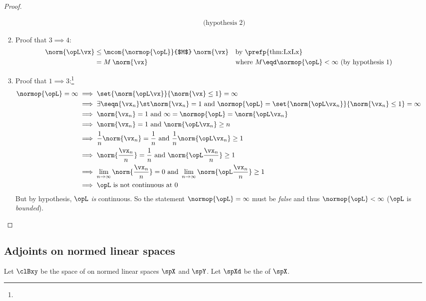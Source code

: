 \begin{proof}
\begin{enumerate}
\begin{align*}
        && \text{(hypothesis 2)}
    \end{align*}
  \item Proof that $3\implies4$:
    \begin{align*}
      \norm  {\opL \vx}
        &\le \mcom{\normop{\opL}}{$M$}\:\norm{\vx}
        &&   \text{by \prefp{thm:LxLx}}
      \\&=   M\:\norm{\vx}
        &&   \text{where $M\eqd\normop{\opL}<\infty$ (by hypothesis 1)}
    \end{align*}
  \item Proof that $1\implies3$:\footnote{}
    \begin{align*}
      \normop{\opL} = \infty
        &\implies \set{\norm{\opL\vx}}{\norm{\vx}\le1} = \infty
      \\&\implies \exists\seqn{\vx_n} \st \norm{\vx_n}=1 \text{ and } \normop{\opL} = \set{\norm{\opL\vx_n}}{\norm{\vx_n}\le1} = \infty
      \\&\implies \norm{\vx_n}=1 \text{ and } \infty=\normop{\opL} = \norm{\opL\vx_n}
      \\&\implies \norm{\vx_n}=1 \text{ and } \norm{\opL\vx_n} \ge n
      \\&\implies \frac{1}{n}\norm{\vx_n}=\frac{1}{n} \text{ and } \frac{1}{n}\norm{\opL\vx_n} \ge 1
      \\&\implies \norm{\frac{\vx_n}{n}}=\frac{1}{n} \text{ and } \norm{\opL\frac{\vx_n}{n}} \ge 1
      \\&\implies \lim_{n\to\infty}\norm{\frac{\vx_n}{n}}=0 \text{ and } \lim_{n\to\infty}\norm{\opL\frac{\vx_n}{n}} \ge 1
      \\&\implies \text{$\opL$ is not continuous at $0$}
    \end{align*}
    But by hypothesis, $\opL$ {\em is} continuous.
    So the statement $\normop{\opL}=\infty$ must be \emph{false} and thus
    $\normop{\opL}<\infty$ ($\opL$ is \emph{bounded}).
\end{enumerate}
\end{proof}



\subsection{Adjoints on normed linear spaces}
\begin{definition}
\label{def:norm_adjoint}
\label{def:adjoint}
Let $\clBxy $ be the space of  on normed linear spaces $\spX$ and $\spY$.
Let $\spXd$ be the  of $\spX$.
\end{definition}


